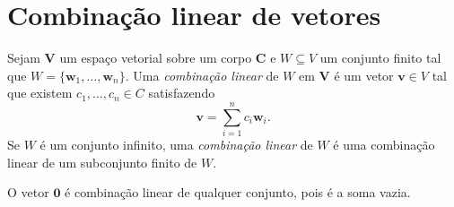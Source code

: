\section{Combinação linear de vetores}

\begin{definition}
	Sejam $\bm V$ um espaço vetorial sobre um corpo $\bm C$ e $W \subseteq V$ um conjunto finito tal que $W=\{\bm w_1,\ldots,\bm w_n\}$. Uma \emph{combinação linear} de $W$ em $\bm V$ é um vetor $\bm v \in V$ tal que existem $c_1,\ldots,c_n \in C$ satisfazendo
	\begin{equation*}
	\bm v = \sum_{i=1}^n c_i\bm w_i.
	\end{equation*}
Se $W$ é um conjunto infinito, uma \emph{combinação linear} de $W$ é uma combinação linear de um subconjunto finito de $W$.


\end{definition}

 O vetor $\bm 0$ é combinação linear de qualquer conjunto, pois é a soma vazia.

